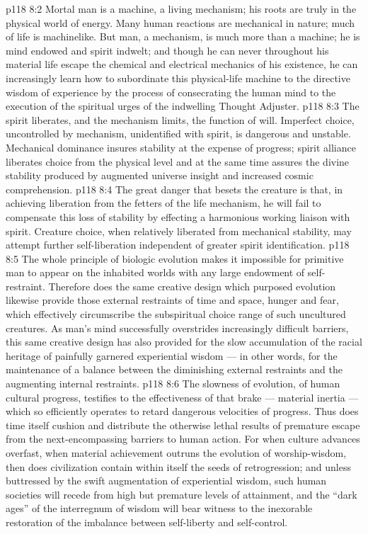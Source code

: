 \vs p118 8:2 Mortal man is a machine, a living mechanism; his roots are truly in the physical world of energy. Many human reactions are mechanical in nature; much of life is machinelike. But man, a mechanism, is much more than a machine; he is mind endowed and spirit indwelt; and though he can never throughout his material life escape the chemical and electrical mechanics of his existence, he can increasingly learn how to subordinate this physical\hyp{}life machine to the directive wisdom of experience by the process of consecrating the human mind to the execution of the spiritual urges of the indwelling Thought Adjuster.
\vs p118 8:3 \pc The spirit liberates, and the mechanism limits, the function of will. Imperfect choice, uncontrolled by mechanism, unidentified with spirit, is dangerous and unstable. Mechanical dominance insures stability at the expense of progress; spirit alliance liberates choice from the physical level and at the same time assures the divine stability produced by augmented universe insight and increased cosmic comprehension.
\vs p118 8:4 The great danger that besets the creature is that, in achieving liberation from the fetters of the life mechanism, he will fail to compensate this loss of stability by effecting a harmonious working liaison with spirit. Creature choice, when relatively liberated from mechanical stability, may attempt further self\hyp{}liberation independent of greater spirit identification.
\vs p118 8:5 The whole principle of biologic evolution makes it impossible for primitive man to appear on the inhabited worlds with any large endowment of self\hyp{}restraint. Therefore does the same creative design which purposed evolution likewise provide those external restraints of time and space, hunger and fear, which effectively circumscribe the subspiritual choice range of such uncultured creatures. As man’s mind successfully overstrides increasingly difficult barriers, this same creative design has also provided for the slow accumulation of the racial heritage of painfully garnered experiential wisdom --- in other words, for the maintenance of a balance between the diminishing external restraints and the augmenting internal restraints.
\vs p118 8:6 The slowness of evolution, of human cultural progress, testifies to the effectiveness of that brake --- material inertia --- which so efficiently operates to retard dangerous velocities of progress. Thus does time itself cushion and distribute the otherwise lethal results of premature escape from the next\hyp{}encompassing barriers to human action. For when culture advances overfast, when material achievement outruns the evolution of worship\hyp{}wisdom, then does civilization contain within itself the seeds of retrogression; and unless buttressed by the swift augmentation of experiential wisdom, such human societies will recede from high but premature levels of attainment, and the “dark ages” of the interregnum of wisdom will bear witness to the inexorable restoration of the imbalance between self\hyp{}liberty and self\hyp{}control.
